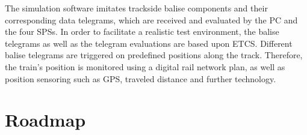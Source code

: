 \documentclass[a4paper, 12pt]{scrartcl}
\begin{document}
The simulation software imitates trackside balise components and their corresponding data telegrams, which are received and evaluated by the PC and the four \acp{SPS}.
In order to facilitate a realistic test environment, the balise telegrams as well as the telegram evaluations are based upon \ac{ETCS}.
Different balise telegrams are triggered on predefined positions along the track.
Therefore, the train's position is monitored using a digital rail network plan, as well as position sensoring such as GPS, traveled distance and further technology.


\section{Roadmap}
\end{document}
